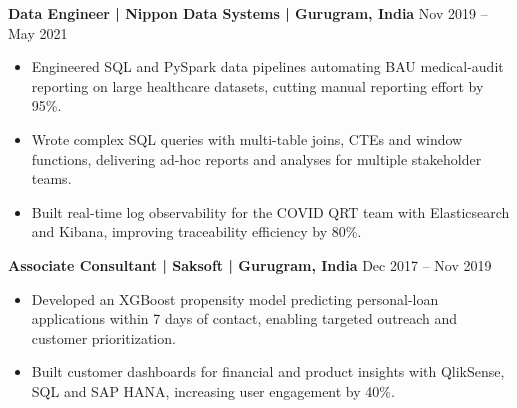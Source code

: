 \documentclass[10pt,a4paper]{article}
\newcommand{\role}[2]{\textbf{#1} \hfill #2\par}
\begin{document}
\role{Data Engineer | Nippon Data Systems | Gurugram, India}{Nov 2019 -- May 2021}
\begin{itemize}
  \item Engineered SQL and PySpark data pipelines automating BAU medical-audit reporting on large healthcare datasets,
  cutting manual reporting effort by 95\%.
  \item Wrote complex SQL queries with multi-table joins, CTEs and window functions, delivering ad-hoc reports and
  analyses for multiple stakeholder teams.
  \item Built real-time log observability for the COVID QRT team with Elasticsearch and Kibana, improving traceability
  efficiency by 80\%.
\end{itemize}
\vspace{3pt}

\role{Associate Consultant | Saksoft | Gurugram, India}{Dec 2017 -- Nov 2019}
\begin{itemize}
  \item Developed an XGBoost propensity model predicting personal-loan applications within 7 days of contact,
  enabling targeted outreach and customer prioritization.
  \item Built customer dashboards for financial and product insights with QlikSense, SQL and SAP HANA, increasing
  user engagement by 40\%.
\end{itemize}
\end{document}
